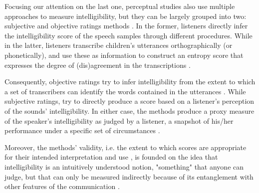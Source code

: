 \begin{comment}	
	
	Based on their description, it seems that perceptual are more subjective than acoustic studies, as they do not rely on "objective" measurements, i.e. time duration, wave amplitude, among others, available in the former. However, for the case of SI, there are objective and subjective assessment methodologies.
		
\end{comment}

Focusing our attention on the last one, perceptual studies also use multiple approaches to measure intelligibility, but they can be largely grouped into two: subjective and objective ratings methods \citep{Hustad_et_al_2020}. In the former, listeners directly infer the intelligibility score of the speech samples through different procedures. While in the latter, listeners transcribe children's utterances orthographically (or phonetically), and use these as information to construct an entropy score that expresses the degree of (dis)agreement in the transcriptions \citep{Boonen_et_al_2021, Shannon_1948}.

Consequently, objective ratings try to infer intelligibility from the extent to which a set of transcribers can identify the words contained in the utterances \citep{Boonen_et_al_2021}. While subjective ratings, try to directly produce a score based on a listener's perception of the sounds' intelligibility. In either case, the methods produce a proxy measure of the speaker's intelligibility as judged by a listener, a snapshot of his/her performance under a specific set of circumstances \citep{Hustad_et_al_2020}. 

Moreover, the methods' validity, i.e. the extent to which scores are appropriate for their intended interpretation and use \citep{Lesterhuis_2018, Trochim_2022}, is founded on the idea that intelligibility is an intuitively understood notion, "something" that anyone can judge, but that can only be measured indirectly because of its entanglement with other features of the communication \citep{Guilford_1954, Stevens_1946}.

\begin{comment}
	
	As the literature suggests, objective rating procedures produce more valid\footnote{validity is understood as the extent to which scores are appropriate for their intended interpretation and use \citep{Lesterhuis_2018, Trochim_2022}.} and reliable\footnote{reliability is though as the extend to which a measure would give us the same result over and over again \citep{Trochim_2022}, i.e. measure something, free from error, in a consistent way.} scores than any other available procedure \citep{Boonen_et_al_2021, Faes_et_al_2021}, as the method does not hinge in the use or production of a \textit{subjective rating scale}, i.e. a scale based on a personal perception of the child's intelligibility.
	
\end{comment}

